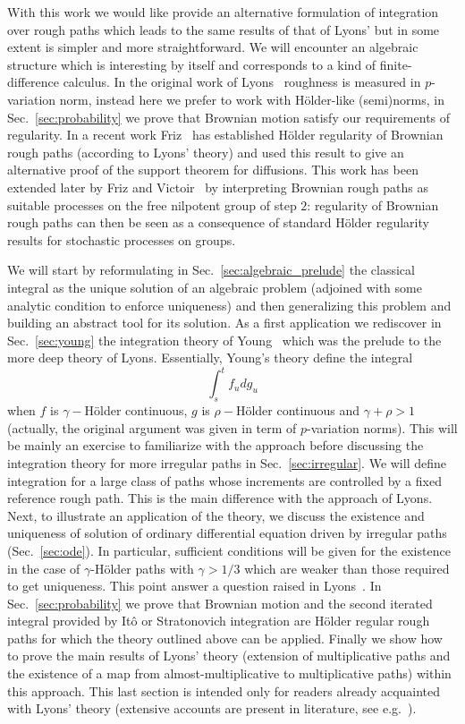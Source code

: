 \documentclass[a4paper,12pt,reqno]{amsproc}
\begin{document}
With this work we would like provide an alternative formulation of
integration over rough paths which leads to the same results of that
of Lyons' but in some extent is simpler and more
straightforward. We will encounter an algebraic structure
which is interesting by itself and corresponds to a kind of
finite-difference calculus. 
In the original work of  Lyons~\cite{Lyons}  roughness is measured in
$p$-variation norm, instead here we prefer to work with H\"older-like
(semi)norms, in Sec.~\ref{sec:probability} we prove that Brownian
motion satisfy our requirements of regularity. In a recent work 
Friz~\cite{fritz} has established H\"older regularity of Brownian rough
paths (according to  Lyons' theory) and used this result to give an
alternative proof of the support theorem for diffusions. This work has
been extended later by Friz and Victoir~\cite{fritz2} by interpreting Brownian rough
paths as suitable processes on the free nilpotent group of step $2$:
regularity of Brownian rough paths can then be seen as a consequence
of standard H\"older regularity results for stochastic processes on groups. 

We will start by reformulating in Sec.~\ref{sec:algebraic_prelude} the classical integral as the unique
solution of an algebraic problem (adjoined with some analytic
condition to enforce uniqueness) and then generalizing this problem
and building an abstract  tool for its solution.
As a first application we rediscover in Sec.~\ref{sec:young} the integration theory of Young~\cite{young} which was the prelude to
the more deep theory of Lyons. Essentially, Young's theory define the integral
$$
\int_s^t f_u dg_u
$$
when $f$ is $\gamma-$H\"older continuous, $g$ is $\rho-$H\"older
continuous and $\gamma+\rho > 1$ (actually, the original argument was given in term of
$p$-variation norms).
This will be mainly an
exercise to familiarize with the approach before discussing the
integration theory for more irregular paths in
Sec.~\ref{sec:irregular}. We will define integration for a large class
of paths whose increments are controlled by a fixed reference rough
path. This is the main difference with the approach of Lyons.
Next, to illustrate an application of the theory, we discuss  the existence and
uniqueness of solution of ordinary differential equation
driven by irregular paths (Sec.~\ref{sec:ode}). In particular,
sufficient conditions will be given for the existence in the case of
$\gamma$-H\"older paths with $\gamma > 1/3$ which are weaker than
those required to get uniqueness. This point answer a question raised
in Lyons~\cite{Lyons}. In Sec.~\ref{sec:probability} we prove that
Brownian motion and the second iterated integral provided by It\^o or
Stratonovich integration are H\"older regular rough paths for which
the theory outlined above can be applied.
Finally we show how to prove the main results of Lyons' theory
(extension of multiplicative paths and the existence of a map from
almost-multiplicative to multiplicative paths) within this
approach. This last section is intended only for readers already
acquainted with Lyons' theory (extensive accounts are present in literature, see e.g.~\cite{Lyons,lyonsbook}). 
\end{document}
